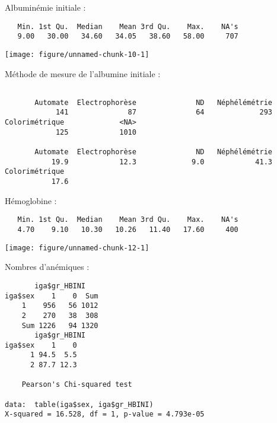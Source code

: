 \documentclass[11pt,a4paper]{article}\usepackage[]{graphicx}\usepackage[]{color}
\makeatletter
\def\maxwidth{ %
  \ifdim\Gin@nat@width>\linewidth
    \linewidth
  \else
    \Gin@nat@width
  \fi
}
\newenvironment{kframe}{%
 \def\at@end@of@kframe{}%
 \ifinner\ifhmode%
  \def\at@end@of@kframe{\end{minipage}}%
  \begin{minipage}{\columnwidth}%
 \fi\fi%
 \def\FrameCommand##1{\hskip\@totalleftmargin \hskip-\fboxsep
 \colorbox{shadecolor}{##1}\hskip-\fboxsep
     \hskip-\linewidth \hskip-\@totalleftmargin \hskip\columnwidth}%
 \MakeFramed {\advance\hsize-\width
   \@totalleftmargin\z@ \linewidth\hsize
   \@setminipage}}%
 {\par\unskip\endMakeFramed%
 \at@end@of@kframe}
\newenvironment{knitrout}{}{} %
\makeatother
\begin{document}
Albuminémie initiale :

\begin{knitrout}
\color{fgcolor}\begin{kframe}
\begin{verbatim}
   Min. 1st Qu.  Median    Mean 3rd Qu.    Max.    NA's 
   9.00   30.00   34.60   34.05   38.60   58.00     707 
\end{verbatim}
\end{kframe}
\texttt{[image: figure/unnamed-chunk-10-1]} 

\end{knitrout}

Méthode de mesure de l'albumine initiale :

\begin{knitrout}
\color{fgcolor}\begin{kframe}
\begin{verbatim}

       Automate  Electrophorèse              ND   Néphélémétrie 
            141              87              64             293 
Colorimétrique             <NA> 
            125            1010 

       Automate  Electrophorèse              ND   Néphélémétrie 
           19.9            12.3             9.0            41.3 
Colorimétrique  
           17.6 
\end{verbatim}
\end{kframe}
\end{knitrout}

Hémoglobine :

\begin{knitrout}
\color{fgcolor}\begin{kframe}
\begin{verbatim}
   Min. 1st Qu.  Median    Mean 3rd Qu.    Max.    NA's 
   4.70    9.10   10.30   10.26   11.40   17.60     400 
\end{verbatim}
\end{kframe}
\texttt{[image: figure/unnamed-chunk-12-1]} 

\end{knitrout}

Nombres d'anémiques :

\begin{knitrout}
\color{fgcolor}\begin{kframe}
\begin{verbatim}
       iga$gr_HBINI
iga$sex    1    0  Sum
    1    956   56 1012
    2    270   38  308
    Sum 1226   94 1320
       iga$gr_HBINI
iga$sex    1    0
      1 94.5  5.5
      2 87.7 12.3

	Pearson's Chi-squared test

data:  table(iga$sex, iga$gr_HBINI)
X-squared = 16.528, df = 1, p-value = 4.793e-05
\end{verbatim}
\end{kframe}
\end{knitrout}
\end{document}
